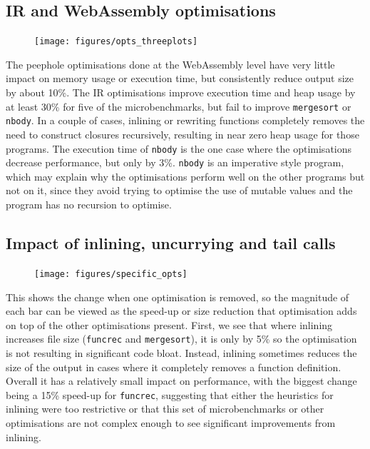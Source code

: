 \subsection{IR and WebAssembly optimisations}

\begin{figure}[H]
\hspace{-1cm}
\texttt{[image: figures/opts\_threeplots]}
 \label{fig:opts} 
\end{figure}

The peephole optimisations done at the WebAssembly level have very little impact on memory usage or execution time, but consistently reduce output size by about 10\%. The IR optimisations improve execution time and heap usage by at least 30\% for five of the microbenchmarks, but fail to improve \verb|mergesort| or \verb|nbody|. In a couple of cases, inlining or rewriting functions completely removes the need to construct closures recursively, resulting in near zero heap usage for those programs. The execution time of \verb|nbody| is the one case where the optimisations decrease performance, but only by 3\%.  \verb|nbody| is an imperative style program, which may explain why the optimisations perform well on the other programs but not on it, since they avoid trying to optimise the use of mutable values and the program has no recursion to optimise.

\subsection{Impact of inlining, uncurrying and tail calls}

\begin{figure}[H]
\hspace{-1cm}
\texttt{[image: figures/specific\_opts]}
 \label{fig:specific-opts} 
\end{figure}

This shows the change when one optimisation is removed, so the magnitude of each bar can be viewed as the speed-up or size reduction that optimisation adds on top of the other optimisations present. First, we see that where inlining increases file size (\verb|funcrec| and \verb|mergesort|), it is only by 5\% so the optimisation is not resulting in significant code bloat. Instead, inlining sometimes reduces the size of the output in cases where it completely removes a function definition. Overall it has a relatively small impact on performance, with the biggest change being a 15\% speed-up for \verb|funcrec|, suggesting that either the heuristics for inlining were too restrictive or that this set of microbenchmarks or other optimisations are not complex enough to see significant improvements from inlining.

